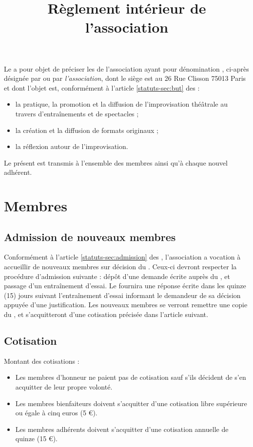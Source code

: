 \documentclass[a4paper,french,10pt]{article}
\title{Règlement intérieur de l'association \metae{}}
\newcommand{\article}[1]{\subsection{#1}\addtocounter{article}{1}}
\newcounter{article}
\newcommand{\artrefst}[1]{article \ref{statuts-#1} des \statuts{}}
\begin{document}
\date{}

\maketitle 
\pagestyle{fancy} 


\rhead{\thepage} 
\cfoot{} 


Le \RI{} a pour objet de préciser les \statuts{} de l'association ayant pour dénomination \textit{\metae{}}, ci-après désignée par \textit{\meta{}} ou par \textit{l'association}, dont le siège est au 26 Rue Clisson 75013 Paris et dont l'objet est, conformément à l'\artrefst{sec:but} :
\begin{itemize}
\item la pratique, la promotion et la diffusion de l'improvisation théâtrale au travers d'entraînements et de spectacles ;
\item la création et la diffusion de formats originaux ;
\item la réflexion autour de l'improvisation.
\end{itemize}

Le présent \RI{} est transmis à l'ensemble des membres ainsi qu'à chaque nouvel adhérent.

\setcounter{article}{1}
\section{Membres}

\article{Admission de nouveaux membres}
\label{sec:admiss-de-nouv}

Conformément à l'\artrefst{sec:admission}, l'association \meta{} a vocation à accueillir de nouveaux membres sur décision du \bureau{}. Ceux-ci devront respecter la procédure d'admission suivante : dépôt d'une demande écrite auprès du \bureau{}, et passage d'un entraînement d'essai. Le \bureau{} fournira une réponse écrite dans les quinze (15) jours suivant l'entraînement d'essai informant le demandeur de sa décision appuyée d'une justification. Les nouveaux membres se verront remettre une copie du \RI{}, et s'acquitteront d'une cotisation précisée dans l'article suivant.

\article{Cotisation}
\label{sec:cotisation}
Montant des cotisations :

\begin{itemize}
\item Les membres d'honneur ne paient pas de cotisation sauf s'ils décident de s'en acquitter de leur propre volonté.
\item Les membres bienfaiteurs doivent s'acquitter d'une cotisation libre supérieure ou égale à cinq euros (5 \euro{}).
\item Les membres adhérents doivent s'acquitter d'une cotisation annuelle de quinze (15 \euro{}).
\end{itemize}
\end{document}
